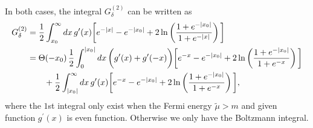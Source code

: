 \documentclass[sn-mathphys,Numbered]{sn-jnl}
\theoremstyle{thmstyleone}%
\theoremstyle{thmstyletwo}%
\theoremstyle{thmstylethree}%
\begin{document}
In both cases, the integral $G^{(2)}_\delta$ can be written as
\begin{align}
G^{(2)}_\delta&=\frac{1}{2}\int^\infty_{x_0}dx\,g^\prime(x)\bigg[e^{-|x|}-e^{-|x_0|}+2\ln\left(\frac{1+e^{-|x_0|}}{1+e^{-|x|}}\right)\bigg]\notag\\
&=\Theta(-x_0)\,\frac{1}{2}\int^{|x_0|}_0dx\,\bigg(g^\prime(x)+g^\prime(-x)\bigg)\bigg[e^{-x}-e^{-|x_0|}+2\ln\left(\frac{1+e^{-|x_0|}}{1+e^{-x}}\right)\bigg]\notag\\
&\qquad+\frac{1}{2}\int^\infty_{|x_0|}dx\,g^\prime(x)\bigg[e^{-x}-e^{-|x_0|}+2\ln\left(\frac{1+e^{-|x_0|}}{1+e^{-x}}\right)\bigg],
\end{align}
where the $1$st integral only exist when the Fermi energy $\tilde\mu>m$ and given function $g^\prime(x)$ is even function. Otherwise we only have the Boltzmann integral.

\end{document}
